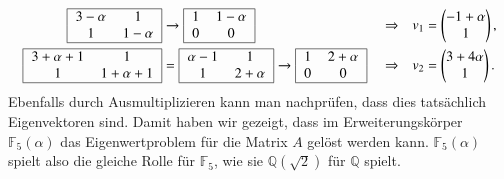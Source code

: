 \[
\begin{aligned}
\begin{tabular}{|>{$}c<{$}>{$}c<{$}|}
\hline
3-\alpha &1       \\
1        &1-\alpha\\
\hline
\end{tabular}
&\rightarrow
\begin{tabular}{|>{$}c<{$}>{$}c<{$}|}
\hline
1        &1-\alpha\\
0        &0       \\
\hline
\end{tabular}
&&\Rightarrow
&v_1&=\begin{pmatrix}-1+\alpha\\ 1 \end{pmatrix},
\\
\begin{tabular}{|>{$}c<{$}>{$}c<{$}|}
\hline
3+\alpha+1 &1       \\
1        &1+\alpha+1\\
\hline
\end{tabular}
&=
\begin{tabular}{|>{$}c<{$}>{$}c<{$}|}
\hline
\alpha-1 &1       \\
1        &2+\alpha\\
\hline
\end{tabular}
\rightarrow
\begin{tabular}{|>{$}c<{$}>{$}c<{$}|}
\hline
1        &2+\alpha\\
0        &0       \\
\hline
\end{tabular}
&&\Rightarrow
&v_2&=\begin{pmatrix}3+4\alpha\\ 1 \end{pmatrix}.
\end{aligned}
\]
Ebenfalls durch Ausmultiplizieren kann man nachprüfen, dass dies tatsächlich
Eigenvektoren sind.
Damit haben wir gezeigt, dass im Erweiterungskörper $\mathbb F_5(\alpha)$
das Eigenwertproblem für die Matrix $A$ gelöst werden kann.
$\mathbb F_5(\alpha)$ spielt also die gleiche Rolle für $\mathbb F_5$, wie
sie $\mathbb Q(\!\sqrt{2})$ für $\mathbb Q$ spielt.

